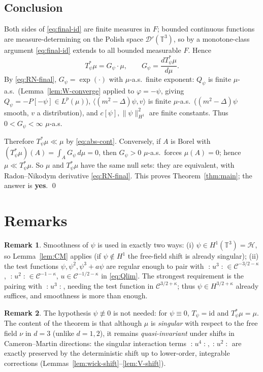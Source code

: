 \documentclass[12pt]{article}
\newcommand{\bT}{\mathbb{T}}
\newcommand{\cD}{\mathcal{D}}
\newcommand{\cH}{\mathcal{H}}
\newcommand{\Wick}[1]{\mathopen{:}#1\mathclose{:}}
\theoremstyle{plain}
\theoremstyle{definition}
\newtheorem{remark}{Remark}
\begin{document}
\subsection{Conclusion}
Both sides of \eqref{eq:final-id} are finite measures in $F$; bounded continuous
functions are measure-determining on the Polish space $\cD'(\bT^3)$, so by a
monotone-class argument \eqref{eq:final-id} extends to all bounded measurable $F$.
Hence
\begin{equation}\label{eq:abs-cont}
T_\psi^*\mu=G_\psi\cdot\mu,\qquad G_\psi=\frac{dT_\psi^*\mu}{d\mu}.
\end{equation}
By \eqref{eq:RN-final}, $G_\psi=\exp(\cdot)$ with $\mu$-a.s.\ finite exponent:
$Q_\psi$ is finite $\mu$-a.s.\ (Lemma~\ref{lem:W-converge} applied to $\varphi=-\psi$,
giving $Q_\psi=-P[-\psi]\in L^p(\mu)$), $\langle(m^2-\Delta)\psi,v\rangle$ is finite
$\mu$-a.s.\ ($(m^2-\Delta)\psi$ smooth, $v$ a distribution), and $c[\psi],
\|\psi\|_{H^1}^2$ are finite constants. Thus $0<G_\psi<\infty$ $\mu$-a.s.

Therefore $T_\psi^*\mu\ll\mu$ by \eqref{eq:abs-cont}. Conversely, if $A$ is Borel
with $(T_\psi^*\mu)(A)=\int_A G_\psi\,d\mu=0$, then $G_\psi>0$ $\mu$-a.s.\ forces
$\mu(A)=0$; hence $\mu\ll T_\psi^*\mu$. So $\mu$ and $T_\psi^*\mu$ have the same
null sets: they are equivalent, with Radon--Nikodym derivative \eqref{eq:RN-final}.
This proves Theorem~\ref{thm:main}; the answer is \textbf{yes}.
\qed

\section{Remarks}

\begin{remark}
Smoothness of $\psi$ is used in exactly two ways: (i) $\psi\in H^1(\bT^3)=\cH$, so
Lemma~\ref{lem:CM} applies (if $\psi\notin H^1$ the free-field shift is already
singular); (ii) the test functions $\psi,\psi^2,\psi^3+a\psi$ are regular enough to
pair with $\Wick{u^3}\in\mathcal C^{-3/2-\kappa}$, $\Wick{u^2}\in\mathcal C^{-1-\kappa}$,
$u\in\mathcal C^{-1/2-\kappa}$ in \eqref{eq:Qlim}. The strongest requirement is the
pairing with $\Wick{u^3}$, needing the test function in $\mathcal C^{3/2+\kappa}$;
thus $\psi\in H^{3/2+\kappa}$ already suffices, and smoothness is more than enough.
\end{remark}

\begin{remark}
The hypothesis $\psi\not\equiv0$ is not needed: for $\psi\equiv0$, $T_\psi=\mathrm{id}$
and $T_\psi^*\mu=\mu$. The content of the theorem is that although $\mu$ is
\emph{singular} with respect to the free field $\nu$ in $d=3$ (unlike $d=1,2$), it
remains \emph{quasi-invariant} under shifts in Cameron--Martin directions: the
singular interaction terms $\Wick{u^4},\Wick{u^2}$ are exactly preserved by the
deterministic shift up to lower-order, integrable corrections
(Lemmas~\ref{lem:wick-shift}--\ref{lem:V-shift}).
\end{remark}
\end{document}
